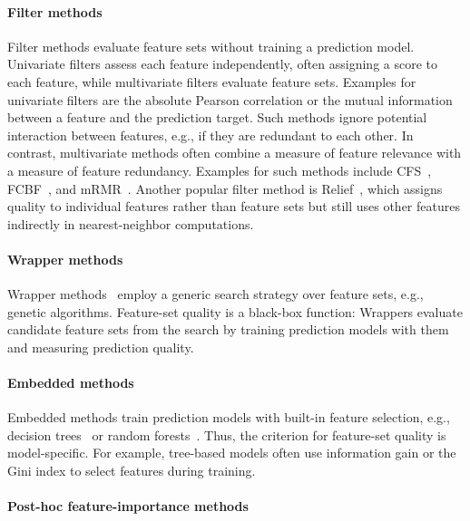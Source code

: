 \documentclass{article}
\theoremstyle{definition}
\begin{document}
\paragraph{Filter methods}

Filter methods evaluate feature sets without training a prediction model.
Univariate filters assess each feature independently, often assigning a score to each feature, while multivariate filters evaluate feature sets.
Examples for univariate filters are the absolute Pearson correlation or the mutual information between a feature and the prediction target.
Such methods ignore potential interaction between features, e.g., if they are redundant to each other.
In contrast, multivariate methods often combine a measure of feature relevance with a measure of feature redundancy.
Examples for such methods include CFS~\cite{hall1999correlation, hall2000correlation}, FCBF~\cite{yu2003feature}, and mRMR~\cite{peng2005feature}.
Another popular filter method is Relief~\cite{kira1992feature, robnik1997adaptation}, which assigns quality to individual features rather than feature sets but still uses other features indirectly in nearest-neighbor computations.

\paragraph{Wrapper methods}

Wrapper methods~\cite{kohavi1997wrappers} employ a generic search strategy over feature sets, e.g., genetic algorithms.
Feature-set quality is a black-box function:
Wrappers evaluate candidate feature sets from the search by training prediction models with them and measuring prediction quality.

\paragraph{Embedded methods}

Embedded methods train prediction models with built-in feature selection, e.g., decision trees~\cite{breiman1984classification} or random forests~\cite{breiman2001random}.
Thus, the criterion for feature-set quality is model-specific.
For example, tree-based models often use information gain or the Gini index to select features during training.

\paragraph{Post-hoc feature-importance methods}
\end{document}
